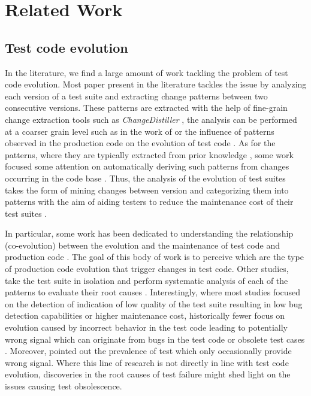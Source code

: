 \chapter{Related Work}
\label{chap:related-work}

\section{Test code evolution}
\label{sec:related-evolution}

In the literature, we find a large amount of work tackling the problem of test code evolution. Most paper present in the literature tackles the issue by analyzing each version of a test suite and extracting change patterns between two consecutive versions. These patterns are extracted with the help of fine-grain change extraction tools such as \emph{ChangeDistiller} \cite{Fluri2007}, the analysis can be performed at a coarser grain level such as in the work of \textcite{Zaidman2011} or the influence of patterns observed in the production code on the evolution of test code \cite{VanRompaey2008}. As for the patterns, where they are typically extracted from prior knowledge \cite{Marsavina2014}, some work focused some attention on automatically deriving such patterns from changes occurring in the code base \cite{Negara2014}. Thus, the analysis of the evolution of test suites takes the form of mining changes between version and categorizing them into patterns with the aim of aiding testers to reduce the maintenance cost of their test suites \cite{Hurdugaci2012}.

In particular, some work has been dedicated to understanding the relationship (co-evolution) between the evolution and the maintenance of test code and production code \cite{Lamkanfi2010, Zaidman2011, Marsavina2014, Levin2017, Vidacs2018, Alenezi2019}. The goal of this body of work is to perceive which are the type of production code evolution that trigger changes in test code. Other studies, take the test suite in isolation and perform systematic analysis of each of the patterns to evaluate their root causes \cite{Pinto2012}. Interestingly, where most studies focused on the detection of indication of low quality of the test suite resulting in low bug detection capabilities or higher maintenance cost, historically fewer focus on evolution caused by incorrect behavior in the test code leading to potentially wrong signal which can originate from bugs in the test code \cite{Vahabzadeh2015} or obsolete test cases \cite{Hao2013, Tang2015}. Moreover, \textcite{Luo2014} pointed out the prevalence of test which only occasionally provide wrong signal. Where this line of research is not directly in line with test code evolution, discoveries in the root causes of test failure might shed light on the issues causing test obsolescence.

